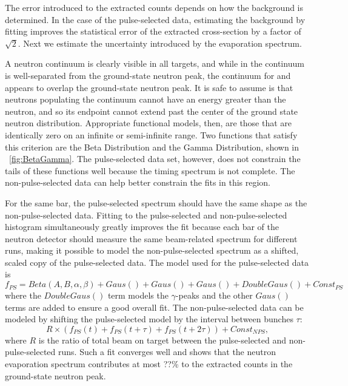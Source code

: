 The error introduced to the extracted counts depends on how the background is determined.  In the case of the pulse-selected data, estimating the background by fitting improves the statistical error of the extracted cross-section by a factor of $\sqrt{2}$.  Next we estimate the uncertainty introduced by the evaporation spectrum.

A neutron continuum is clearly visible in all targets, and while in  the continuum is well-separated from the ground-state neutron peak, the continuum for  and  appears to overlap the ground-state neutron peak.  It is safe to assume is that neutrons populating the continuum cannot have an energy greater than the \zp neutron, and so its endpoint cannot extend past the center of the ground state neutron distribution.  Appropriate functional models, then, are those that are identically zero on an infinite or semi-infinite range.  Two functions that satisfy this criterion are the Beta Distribution and the Gamma Distribution, shown in {\fig}~\ref{fig:BetaGamma}.  The pulse-selected data set, however, does not constrain the tails of these functions well because the timing spectrum is not complete.  The non-pulse-selected data can help better constrain the fits in this region.

For the same bar, the pulse-selected spectrum should have the same shape as the non-pulse-selected data.  Fitting to the pulse-selected and non-pulse-selected histogram simultaneously greatly improves the fit because each bar of the neutron detector should measure the same beam-related spectrum for different runs, making it possible to model the non-pulse-selected spectrum as a shifted, scaled copy of the pulse-selected data.  The model used for the pulse-selected data is
\begin{equation}
f_{PS} = Beta(A,B,\alpha,\beta) + Gaus() + Gaus() + Gaus() + DoubleGaus() + Const_{PS}
\end{equation}
where the $DoubleGaus()$ term models the $\gamma$-peaks and the other $Gaus()$ terms are added to ensure a good overall fit.  The non-pulse-selected data can be modeled by shifting the pulse-selected model by the interval between bunches $\tau$:
\begin{equation}
R\times(f_{PS}(t) + f_{PS}(t+\tau) + f_{PS}(t+2\tau)) + Const_{NPS},
\end{equation}
where $R$ is the ratio of total beam on target between the pulse-selected and non-pulse-selected runs.  Such a fit converges well and shows that the neutron evaporation spectrum contributes at most ??\% to the extracted counts in the ground-state neutron peak.  

